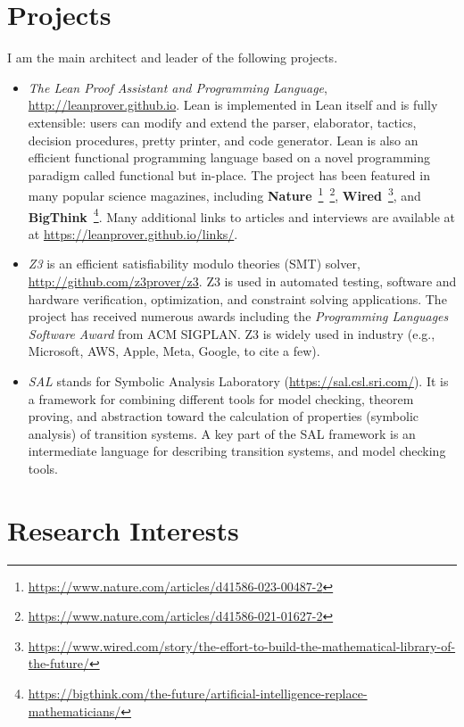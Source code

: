 \documentclass{article}
\begin{document}
\section*{Projects}

I am the main architect and leader of the following projects.

\begin{itemize}
\item {\em The Lean Proof Assistant and Programming Language}, \url{http://leanprover.github.io}.
Lean is implemented in Lean itself and is fully extensible: users can modify and extend the parser, elaborator,
tactics, decision procedures, pretty printer, and code generator.
Lean is also an efficient functional programming language based on a novel programming paradigm called functional but in-place.
The project has been featured in many popular science magazines, including
{\bf Nature}~\footnote{\url{https://www.nature.com/articles/d41586-023-00487-2}}~\footnote{\url{https://www.nature.com/articles/d41586-021-01627-2}},
  {\bf Wired}~\footnote{\url{https://www.wired.com/story/the-effort-to-build-the-mathematical-library-of-the-future/}},
  and {\bf BigThink}~\footnote{\url{https://bigthink.com/the-future/artificial-intelligence-replace-mathematicians/}}.
  Many additional links to articles and interviews are available at at \url{https://leanprover.github.io/links/}.

\item {\em Z3} is an efficient satisfiability modulo theories (SMT) solver, \url{http://github.com/z3prover/z3}.
  Z3 is used in automated testing, software and hardware verification, optimization, and constraint solving applications.
  The project has received numerous awards including the {\em Programming Languages Software Award} from ACM SIGPLAN.
  Z3 is widely used in industry (e.g., Microsoft, AWS, Apple, Meta, Google, to cite a few).

\item {\em SAL} stands for Symbolic Analysis Laboratory (\url{https://sal.csl.sri.com/}). It is a framework for combining different tools for
 model checking, theorem proving, and abstraction toward the calculation of properties (symbolic analysis) of transition systems. A
 key part of the SAL framework is an intermediate language for describing transition systems, and model checking tools.

\end{itemize}

\section*{Research Interests}
\end{document}
